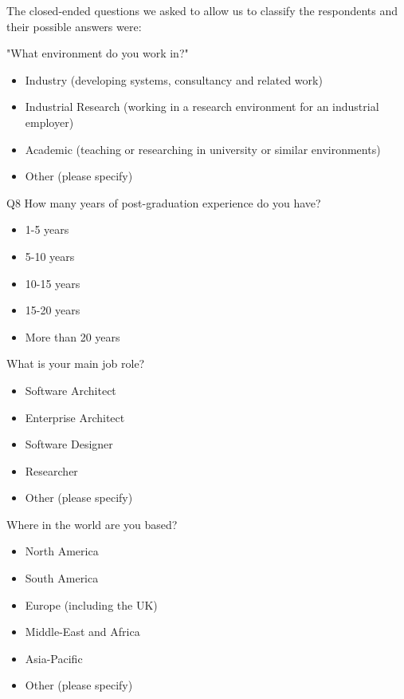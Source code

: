The closed-ended questions we asked to allow us to classify the respondents and their possible answers were:

\begin{description}
	\item [Q7] "What environment do you work in?"
	\begin{itemize}
		\item Industry (developing systems, consultancy and related work)
		\item Industrial Research (working in a research environment for an industrial employer) 
		\item Academic (teaching or researching in university or similar environments)
		\item Other (please specify)
	\end{itemize}
	\begin{minipage}{\textwidth} %
	\item [Q8] How many years of post-graduation experience do you have? \nolinebreak
	\begin{itemize}
		\item 1-5 years
		\item 5-10 years
		\item 10-15 years
		\item 15-20 years
		\item More than 20 years
    \end{itemize}
    \end{minipage}
    \vspace{1pt} %
	\item [Q9] What is your main job role? \nolinebreak
	\begin{itemize}
		\item Software Architect
		\item Enterprise Architect
		\item Software Designer
		\item Researcher
		\item Other (please specify)
    \end{itemize}
	\item [Q10] Where in the world are you based?
	\begin{itemize}
		\item North America
		\item South America 
		\item Europe (including the UK) 
		\item Middle-East and Africa 
		\item Asia-Pacific
		\item Other (please specify)
	\end{itemize}
\end{description}

